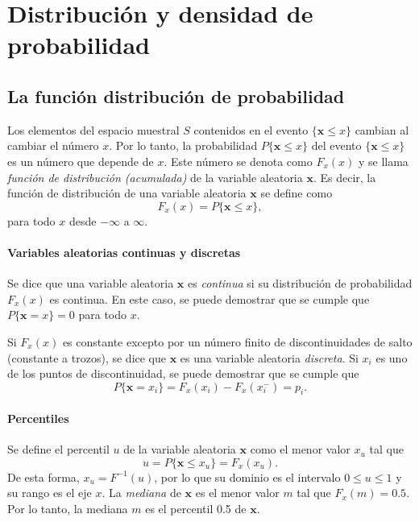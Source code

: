 \documentclass[a4paper]{report}
\newcommand{\x}{\mathbf{x}}
\begin{document}
\section{Distribución y densidad de probabilidad}

\subsection{La función distribución de probabilidad}\label{sec:distribution_function}

Los elementos del espacio muestral \(S\) contenidos en el evento \(\{\x\leq x\}\) cambian al cambiar el número \(x\). Por lo tanto, la probabilidad \(P\{\x\leq x\}\) del evento \(\{\x\leq x\}\) es un número que depende de \(x\). Este número se denota como \(F_x(x)\) y se llama \emph{función de distribución (acumulada)} de la variable aleatoria \(\x\). Es decir, la función de distribución de una variable aleatoria \(\x\) se define como
\[
 F_x(x)=P\{\x\leq x\},
\]
para todo \(x\) desde \(-\infty\) a \(\infty\).

\paragraph{Variables aleatorias continuas y discretas}

Se dice que una variable aleatoria \(\x\) es \emph{continua} si su distribución de probabilidad \(F_x(x)\) es continua. En este caso, se puede demostrar que se cumple que \(P\{\x=x\}=0\) para todo \(x\).

Si \(F_x(x)\) es constante excepto por un número finito de discontinuidades de salto (constante a trozos), se dice que \(\x\) es una variable aleatoria \emph{discreta}. Si \(x_i\) es uno de los puntos de discontinuidad, se puede demostrar que se cumple que
\[
 P\{\x=x_i\}=F_x(x_i)-F_x(x^-_i)=p_i.
\]

\paragraph{Percentiles}

Se define el percentil \(u\) de la variable aleatoria \(\x\) como el menor valor \(x_u\) tal que
\[
 u=P\{\x\leq x_u\}=F_x(x_u).
\]
De esta forma, \(x_u=F^{-1}(u)\), por lo que su dominio es el intervalo \(0\leq u \leq 1\) y su rango es el eje \(x\). La \emph{mediana} de \(\x\) es el menor valor \(m\) tal que \(F_x(m)=0.5\). Por lo tanto, la mediana \(m\) es el percentil 0.5 de \(\x\).
\end{document}
